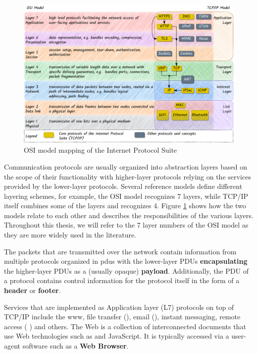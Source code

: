 \begin{figure}
\centering
\includegraphics[width=1\textwidth,height=\textheight]{thesis/../figures/osi-map-tcp.drawio.pdf}
\caption{OSI model mapping of the Internet Protocol
Suite\label{osi-map-tcp}}
\end{figure}

Communication protocols are usually organized into abstraction layers
based on the scope of their functionality with higher-layer protocols
relying on the services provided by the lower-layer protocols. Several
reference models define different layering schemes, for example, the OSI
model recognizes 7 layers, while TCP/IP itself combines some of the
layers and recognizes 4. Figure \ref{osi-map-tcp} shows how the two
models relate to each other and describes the responsibilities of the
various layers. Throughout this thesis, we will refer to the 7 layer
numbers of the OSI model as they are more widely used in the literature.

The packets that are transmitted over the network contain information
from multiple protocols organized in \glspl{pdu} with the lower-layer
PDUs \textbf{encapsulating} the higher-layer PDUs as a (usually opaque)
\textbf{payload}. Additionally, the PDU of a protocol contains control
information for the protocol itself in the form of a \textbf{header} or
\textbf{footer}.

Services that are implemented as Application layer (L7) protocols on top
of TCP/IP include the \gls{www}, file transfer (), email
(), instant messaging, remote access (
\autocite{sshRFC}) and others. The Web is a collection of interconnected
documents that use Web technologies such as  and JavaScript. It
is typically accessed via a user-agent software such as a \textbf{Web
Browser}.

